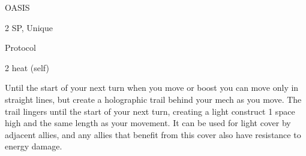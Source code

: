 OASIS

2 SP, Unique

Protocol

2 heat (self)

Until the start of your next turn when you move or boost you can move only in straight lines, but
create a holographic trail behind your mech as you move. The trail lingers until the start of your
next turn, creating a light construct 1 space high and the same length as your movement. It can
be used for light cover by adjacent allies, and any allies that benefit from this cover also have
resistance to energy damage.

